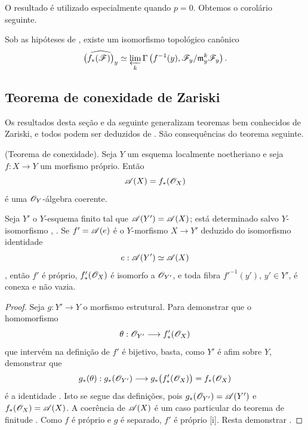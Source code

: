 \begin{env}[4.2.3]
\label{III.4.2.3}
O resultado  é utilizado especialmente quando $p=0$.
Obtemos o corolário seguinte.
\end{env}

\begin{corollary}[4.2.4]
\label{III.4.2.4}
Sob as hipóteses de , existe um isomorfismo
topológico canônico
\[
  \widehat{\bigl(f_*(\mathscr{F})\bigr)_y}
  \simeq
  \varprojlim_k
  \Gamma\left(
    f^{-1}(y),
    \mathscr{F}_y/\mathfrak{m}_y^k\mathscr{F}_y
  \right).
\]
\end{corollary}


\subsection{Teorema de conexidade de Zariski}
\label{subsection:III.4.3}
\label{III.4.3}

Os resultados desta seção e da seguinte generalizam teoremas
bem conhecidos de Zariski, e todos podem ser deduzidos de
. São consequências do teorema seguinte.

\begin{theorem}[4.3.1]
\label{III.4.3.1}
\textnormal{(Teorema de conexidade).}
Seja $Y$ um esquema localmente noetheriano e seja $f:X\to Y$ um
morfismo próprio. Então
\[
  \mathscr{A}(X)=f_*(\mathscr{O}_X)
\]
é uma $\mathscr{O}_Y$-álgebra coerente.


Seja $Y'$ o $Y$-esquema finito tal que
$\mathscr{A}(Y')=\mathscr{A}(X)$; está determinado salvo $Y$-isomorfismo
, .
Se $f'=\mathscr{A}(e)$ é o $Y$-morfismo $X\to Y'$ deduzido do
isomorfismo identidade
\[
  e:\mathscr{A}(Y')\simeq\mathscr{A}(X)
\]
, então $f'$ é próprio,
$f'_*(\mathscr{O}_X)$ é isomorfo a $\mathscr{O}_{Y'}$, e toda fibra
$f'^{-1}(y')$, $y'\in Y'$, é conexa e não vazia.
\end{theorem}

\begin{proof}
Seja $g:Y'\to Y$ o morfismo estrutural. Para demonstrar que o
homomorfismo
\[
  \theta:\mathscr{O}_{Y'}\longrightarrow f'_*(\mathscr{O}_X)
\]
que intervém na definição de $f'$ é bijetivo, basta, como
$Y'$ é afim sobre $Y$, demonstrar que
\[
  g_*(\theta):
  g_*(\mathscr{O}_{Y'})
  \longrightarrow
  g_*\bigl(f'_*(\mathscr{O}_X)\bigr)
  =
  f_*(\mathscr{O}_X)
\]
é a identidade . Isto se segue das
definições, pois
$g_*(\mathscr{O}_{Y'})=\mathscr{A}(Y')$ e
$f_*(\mathscr{O}_X)=\mathscr{A}(X)$.
A coerência de $\mathscr{A}(X)$ é um caso particular do teorema de
finitude . Como $f$ é próprio e $g$ é separado,
$f'$ é próprio [i]. Resta demonstrar
.
\end{proof}

